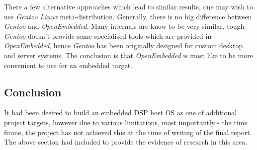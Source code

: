   There a few alternative approaches which lead to similar results,
 one may wish to use \emph{Gentoo Linux} meta-distribution.
 Generally, there is no big difference between \emph{Gentoo} and
 \emph{OpenEmbedded}. Many internals are know to be very similar,
 tough \emph{Gentoo} doesn't provide some specialised tools which 
 are provided in \emph{OpenEmbedded}, hence \emph{Gentoo} has been
 originally designed for custom desktop and server systems.
 The conclusion is that \emph{OpenEmbedded} is most like to be
 more convenient to use for an embedded target.
 

\subsection{Conclusion}

  It had been desired to build an embedded DSP host OS as one of
 additional project targets, however due to various limitations, most
 importantly - the time frame, the project has not achieved this at
 the time of writing of the final report. The above section had included
 to provide the evidence of research in this area.

